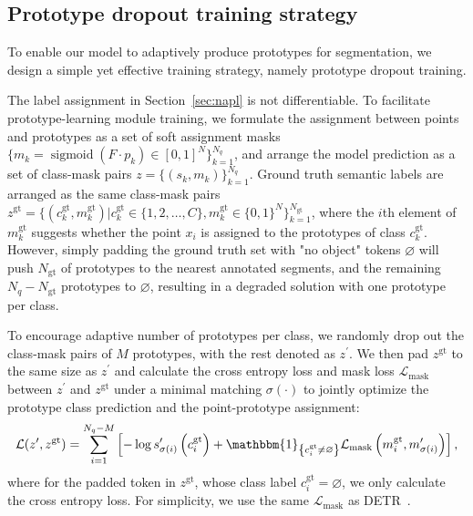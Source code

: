\documentclass[runningheads]{llncs}
\begin{document}
\subsection{Prototype dropout training strategy}
To enable our model to adaptively produce prototypes for segmentation, we design a simple yet effective training strategy, namely prototype dropout training.

The label assignment in Section~\ref{sec:napl} is not differentiable. To facilitate prototype-learning module training, we formulate the assignment between points and prototypes as a set of soft assignment masks $\{m_k = \operatorname{sigmoid}(F \cdot p_k) \in \left[0,1\right]^{N}\}_{k=1}^{N_q}$, and arrange the model prediction as a set of class-mask pairs $z = \{ (s_k, m_k)\}_{k=1}^{N_q}$. Ground truth semantic labels are arranged as the same class-mask pairs $z^{\text{gt}} = \{ (c_k^{\text{gt}}, m_k^{\text{gt}}) |c_k^{\text{gt}} \in \{ 1, 2, \dots, C\}, m_k^{\text{gt}} \in \{0, 1 \}^{N} \}_{k=1}^{N_{\text{gt}}}$, where the $i$th element of $m_k^{\text{gt}}$ suggests whether the point $x_i$ is assigned to the prototypes of class $c_k^{\text{gt}}$. However, simply padding the ground truth set with "no object" tokens $\varnothing$ will
push $N_{\text{gt}}$ of prototypes to the nearest annotated segments, and the remaining $N_q - N_{\text{gt}}$ prototypes to $\varnothing$, resulting in a degraded solution with one prototype per class. 

To encourage adaptive number of prototypes per class, we randomly drop out the class-mask pairs of $M$ prototypes, with the rest denoted as $z^{\prime}$.
We then pad $z^{\text{gt}}$ to the same size as $z^{\prime}$ and calculate the cross entropy loss and mask loss $\mathcal{L}_{\text{mask}}$ between $z^{\prime}$ and $z^{\text{gt}}$ under a minimal matching $\sigma(\cdot)$ to jointly optimize the prototype class prediction and the point-prototype assignment:
\begin{equation*}
    \mathcal{L}(z^{\prime}, z^{\text{gt}})=\sum_{i=1}^{N_q - M}\left[-\log s^{\prime}_{\sigma(i)}\left(c_{i}^{\text{gt}}\right) + \mathbbm{1}_{\left\{c_{i}^{\text{gt}} \neq \varnothing\right\}} \mathcal{L}_{\text{mask}}\left(m_{i}^{\text{gt}}, m^{\prime}_{\sigma(i)}\right)\right],
\end{equation*}
where for the padded token in $z^{\text{gt}}$, whose class label $c_{i}^{\text{gt}} = \varnothing$, we only calculate the cross entropy loss. 
For simplicity, we use the same $\mathcal{L}_{\text{mask}}$ as DETR~\cite{carion2020end}.
\end{document}
